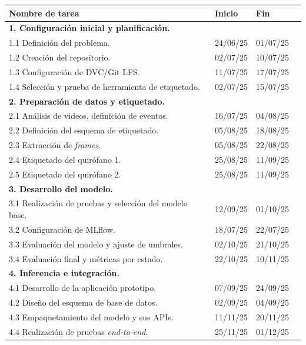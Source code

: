 \documentclass[
11pt, %
]{charter}
\begin{document}
\begin{table}[ht]
	\begin{tabularx}{\linewidth}{@{}|l|X|X|l|@{}}
		\hline
		\rowcolor[HTML]{C0C0C0}
		\textbf{Nombre de tarea} & \textbf{Inicio} & \textbf{Fin} \\ \hline
		\multicolumn{3}{|l|}{\textbf{1. Configuración inicial y planificación.}} \\ \hline
		1.1 Definición del problema. & 24/06/25 & 01/07/25 \\ \hline
		1.2 Creación del repositorio. & 02/07/25 & 10/07/25 \\ \hline
		1.3 Configuración de DVC/Git LFS. & 11/07/25 & 17/07/25 \\ \hline
		1.4 Selección y prueba de herramienta de etiquetado. & 02/07/25 & 15/07/25 \\ \hline
		\multicolumn{3}{|l|}{\textbf{2. Preparación de datos y etiquetado.}} \\ \hline
		2.1 Análisis de videos, definición de eventos. & 16/07/25 & 04/08/25 \\ \hline
		2.2 Definición del esquema de etiquetado. & 05/08/25 & 18/08/25 \\ \hline
		2.3 Extracción de \textit{frames}. & 05/08/25 & 22/08/25 \\ \hline
		2.4 Etiquetado del quirófano 1. & 25/08/25 & 11/09/25 \\ \hline
		2.5 Etiquetado del quirófano 2. & 25/08/25 & 11/09/25 \\ \hline
		\multicolumn{3}{|l|}{\textbf{3. Desarrollo del modelo.}} \\ \hline
		3.1 Realización de pruebas y selección del modelo base. & 12/09/25 & 01/10/25 \\ \hline
		3.2 Configuración de MLflow. & 18/07/25 & 22/07/25 \\ \hline
		3.3 Evaluación del modelo y ajuste de umbrales. & 02/10/25 & 21/10/25 \\ \hline
		3.4 Evaluación final y métricas por estado. & 22/10/25 & 10/11/25 \\ \hline
		\multicolumn{3}{|l|}{\textbf{4. Inferencia e integración.}} \\ \hline
		4.1 Desarrollo de la aplicación prototipo. & 07/09/25 & 24/09/25 \\ \hline
		4.2 Diseño del esquema de base de datos. & 02/09/25 & 04/09/25 \\ \hline
		4.3 Empaquetamiento del modelo y sus APIs. & 11/11/25 & 20/11/25 \\ \hline
		4.4 Realización de pruebas \textit{end-to-end}. & 25/11/25 & 01/12/25 \\ \hline

\end{tabularx}
\end{table}
\end{document}
